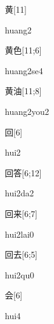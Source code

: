 \begin{verbete}[huang2]{黄}[11]
\begin{pronuncia}{huang2}
\end{pronuncia}
\end{verbete}

\begin{verbete}[huang2se4]{黄色}[11;6]
\begin{pronuncia}{huang2se4}
\end{pronuncia}
\end{verbete}

\begin{verbete}{黄油}[11;8]
\begin{pronuncia}{huang2you2}
\end{pronuncia}
\end{verbete}

\begin{verbete}[hui2]{回}[6]
\begin{pronuncia}{hui2}
\end{pronuncia}
\end{verbete}

\begin{verbete}[hui2da2]{回答}[6;12]
\begin{pronuncia}{hui2da2}
\end{pronuncia}
\end{verbete}

\begin{verbete}{回来}[6;7]
\begin{pronuncia}{hui2lai0}
\end{pronuncia}
\end{verbete}

\begin{verbete}[hui2qu0]{回去}[6;5]
\begin{pronuncia}{hui2qu0}
\end{pronuncia}
\end{verbete}

\begin{verbete}[hui4]{会}[6]
\begin{pronuncia}{hui4}
\end{pronuncia}
\end{verbete}

